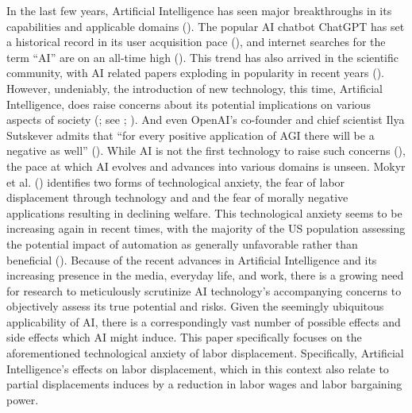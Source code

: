 \documentclass[
  12pt,
  a4paperpaper,
]{article}
\begin{document}
In the last few years, Artificial Intelligence has seen major
breakthroughs in its capabilities and applicable domains
(). The popular AI chatbot ChatGPT has set a historical
record in its user acquisition pace (), and internet searches for the term ``AI'' are on an all-time
high (). This trend has
also arrived in the scientific community, with AI related papers
exploding in popularity in recent years
(). However, undeniably, the introduction of new technology, this
time, Artificial Intelligence, does raise concerns about its potential
implications on various aspects of society
(; see
; ). And even OpenAI's co-founder and chief scientist Ilya
Sutskever admits that ``for every positive application of AGI there will
be a negative as well'' ().
While AI is not the first technology to raise such concerns
(), the
pace at which AI evolves and advances into various domains is unseen.
Mokyr et al. () identifies
two forms of technological anxiety, the fear of labor displacement
through technology and and the fear of morally negative applications
resulting in declining welfare. This technological anxiety seems to be
increasing again in recent times, with the majority of the US population
assessing the potential impact of automation as generally unfavorable
rather than beneficial
(). Because of
the recent advances in Artificial Intelligence and its increasing
presence in the media, everyday life, and work, there is a growing need
for research to meticulously scrutinize AI technology's accompanying
concerns to objectively assess its true potential and risks. Given the
seemingly ubiquitous applicability of AI, there is a correspondingly
vast number of possible effects and side effects which AI might induce.
This paper specifically focuses on the aforementioned technological
anxiety of labor displacement. Specifically, Artificial Intelligence's
effects on labor displacement, which in this context also relate to
partial displacements induces by a reduction in labor wages and labor
bargaining power.
\end{document}
